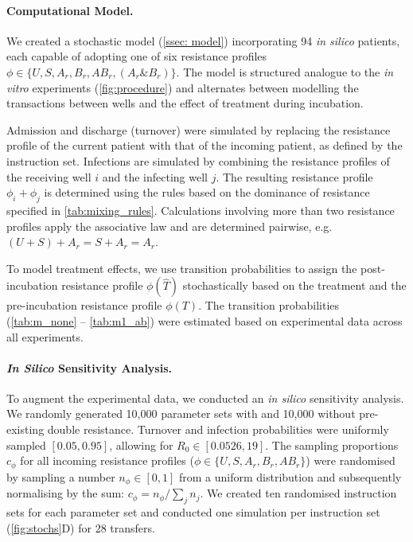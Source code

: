 \paragraph{Computational Model.}
We created a stochastic model (\autoref{ssec: model}) incorporating 94 \textit{in silico} patients, each capable of adopting one of six resistance profiles $\phi \in \{U, S, A_r, B_r, AB_r, (A_r\&B_r)\}$.
The model is structured analogue to the \textit{in vitro} experiments (\autoref{fig:procedure}) and alternates between modelling the transactions between wells and the effect of treatment during incubation.

Admission and discharge (turnover) were simulated by replacing the resistance profile of the current patient with that of the incoming patient, as defined by the instruction set.
Infections are simulated by combining the resistance profiles of the receiving well $i$ and the infecting well $j$.
The resulting resistance profile $\phi_i + \phi_j$ is determined using the rules based on the dominance of resistance specified in \autoref{tab:mixing_rules}.
Calculations involving more than two resistance profiles apply the associative law and are determined pairwise, e.g. $(U + S) + A_r = S + A_r = A_r$.

To model treatment effects, we use transition probabilities to assign the post-incubation resistance profile $\phi(\hat{T})$ stochastically based on the treatment and the pre-incubation resistance profile $\phi(T)$.
The transition probabilities (\autoref{tab:m_none} -- \ref{tab:m1_ab}) were estimated based on experimental data across all experiments.

\paragraph{\textit{In Silico} Sensitivity Analysis.}
To augment the experimental data, we conducted an \textit{in silico} sensitivity analysis.
We randomly generated 10,000 parameter sets with and 10,000 without pre-existing double resistance.
Turnover and infection probabilities were uniformly sampled $[0.05, 0.95]$, allowing for  $R_0 \in [0.0526, 19]$.
The sampling proportions $c_\phi$ for all incoming resistance profiles ($\phi \in \{U, S, A_r, B_r, AB_r\}$) were randomised by sampling a number $n_\phi \in [0, 1]$ from a uniform distribution and subsequently normalising by the sum: $c_\phi = {n_\phi}/{\sum_j n_j}$.
We created ten randomised instruction sets for each parameter set and conducted one simulation per instruction set (\autoref{fig:stochs}D) for 28 transfers.

